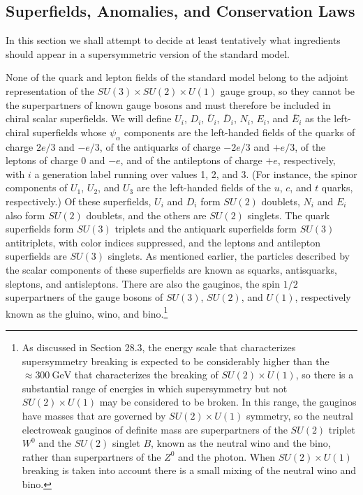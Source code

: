 
\subsection{Superfields, Anomalies, and Conservation Laws}

In this section we shall attempt to decide at least tentatively what
ingredients should appear in a supersymmetric version of the standard
model.

None of the quark and lepton fields of the standard model belong to the
adjoint representation of the
\(SU(3)\times SU(2)\times U(1)\) gauge group, so they
cannot be the superpartners of known gauge bosons and must therefore be
included in chiral scalar superfields. We will define \(U_i\), \(D_i\),
\(\bar U_i\), \(\bar D_i\), \(N_i\), \(E_i\), and \(\bar E_i\) as the
left-chiral superfields whose \(\psi_\alpha\) components are the
left-handed
fields of the quarks of charge \(2e/3\) and \(-e/3\), of the antiquarks
of charge \(-2e/3\) and \(+e/3\), of the leptons of charge \(0\) and
\(-e\), and of the antileptons of charge \(+e\), respectively, with
\(i\) a generation label running over values 1, 2, and 3. (For instance,
the spinor components of \(U_1\), \(U_2\), and \(U_3\) are the
left-handed fields of the \(u\), \(c\), and \(t\) quarks, respectively.)
Of these superfields, \(U_i\) and \(D_i\) form \(SU(2)\) doublets,
\(N_i\) and \(E_i\) also form \(SU(2)\) doublets, and the others are
\(SU(2)\) singlets. The quark superfields form \(SU(3)\) triplets and
the antiquark superfields form \(SU(3)\) antitriplets, with color indices
suppressed, and the leptons and antilepton superfields are \(SU(3)\)
singlets. As mentioned earlier, the particles described by the scalar
components of these superfields are known as squarks, antisquarks,
sleptons, and antisleptons. There are also the gauginos, the spin \(1/2\)
superpartners of the gauge bosons of \(SU(3)\), \(SU(2)\), and \(U(1)\),
respectively known as the gluino, wino, and bino.\footnote{As discussed
in Section 28.3, the energy scale that characterizes supersymmetry
breaking is expected to be considerably higher than the
\(\approx 300\ \mathrm{GeV}\) that characterizes the breaking of
\(SU(2)\times U(1)\), so there is a substantial range of
energies in which supersymmetry but not \(SU(2)\times U(1)\) may
be considered to be broken. In this range, the gauginos have masses that
are governed by \(SU(2)\times U(1)\) symmetry, so the neutral
electroweak gauginos of definite mass are superpartners of the \(SU(2)\)
triplet \(W^0\) and the \(SU(2)\) singlet \(B\), known as the neutral
wino and the bino, rather than superpartners of the \(Z^0\) and the
photon. When \(SU(2)\times U(1)\) breaking is taken into account
there is a small mixing of the neutral wino and bino.}

